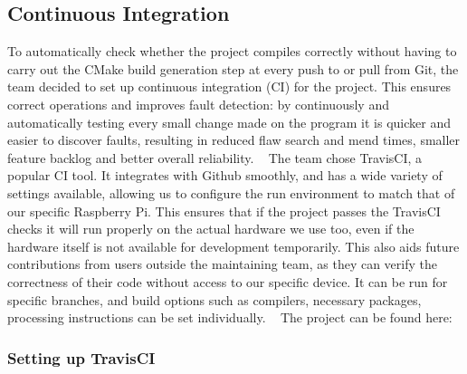 \subsection*{Continuous Integration}

To automatically check whether the project compiles correctly without having to carry out the C\+Make build generation step at every push to or pull from Git, the team decided to set up continuous integration (CI) for the project. This ensures correct operations and improves fault detection\+: by continuously and automatically testing every small change made on the program it is quicker and easier to discover faults, resulting in reduced flaw search and mend times, smaller feature backlog and better overall reliability. ~\newline
 The team chose Travis\+CI, a popular CI tool. It integrates with Github smoothly, and has a wide variety of settings available, allowing us to configure the run environment to match that of our specific Raspberry Pi. This ensures that if the project passes the Travis\+CI checks it will run properly on the actual hardware we use too, even if the hardware itself is not available for development temporarily. This also aids future contributions from users outside the maintaining team, as they can verify the correctness of their code without access to our specific device. It can be run for specific branches, and build options such as compilers, necessary packages, processing instructions can be set individually. ~\newline
 The project can be found here\+: \href{https://travis-ci.com/itsBelinda/ENG5220-2020-Team13}{\tt }

\subsubsection*{Setting up Travis\+CI}


